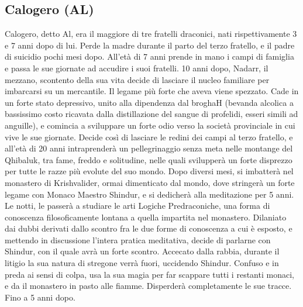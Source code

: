 \documentclass{article}
\begin{document}
\subsection{Calogero (AL) }
Calogero, detto Al, era il maggiore di tre fratelli draconici, nati rispettivamente 3 e 7 anni dopo di lui. Perde la madre durante il parto del terzo fratello, e il padre di suicidio pochi mesi dopo. All’età di 7 anni prende in mano i campi di famiglia e passa le sue giornate ad accudire i suoi fratelli. 10 anni dopo, Nadarr, il mezzano, scontento della sua vita decide di lasciare il nucleo familiare per imbarcarsi su un mercantile.  Il legame più forte che aveva viene spezzato. Cade in un forte stato depressivo, unito alla dipendenza dal broghaH (bevanda alcolica a bassissimo costo ricavata dalla distillazione del sangue di profelidi, esseri simili ad anguille), e comincia a sviluppare un forte odio verso la società provinciale in cui vive le sue giornate. Decide così di lasciare le redini dei campi al terzo fratello, e all’età di 20 anni intraprenderà un pellegrinaggio senza meta nelle montange del Qhibaluk, tra fame, freddo e solitudine, nelle quali svilupperà un forte disprezzo per tutte le razze più evolute del suo mondo. Dopo diversi mesi, si imbatterà nel monastero di Krishvalider, ormai dimenticato dal mondo, dove stringerà un forte legame con Monaco Maestro Shindur, e si dedicherà alla meditazione per 5 anni.  Le notti, le passerà a studiare le arti Logiche Predraconiche, una forma di conoscenza filosoficamente lontana a quella impartita nel monastero.  Dilaniato dai dubbi derivati dallo scontro fra le due forme di conoscenza a cui è esposto, e mettendo in discussione l’intera pratica meditativa, decide di parlarne con Shindur, con il quale avrà un forte scontro. Accecato dalla rabbia, durante il litigio la sua natura di stregone verrà fuori, uccidendo Shindur.  Confuso e in preda ai sensi di colpa, usa la sua magia per far scappare tutti i restanti monaci, e da il monastero in pasto alle fiamme. Disperderà completamente le sue tracce. Fino a 5 anni dopo.
\end{document}
